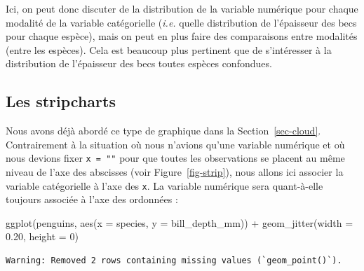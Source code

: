 \documentclass[
  a4paper,
  DIV=11,
  numbers=noendperiod,
  oneside]{scrreprt}
\newenvironment{Shaded}{}{}
\newcommand{\AttributeTok}[1]{\textcolor[rgb]{0.84,0.23,0.29}{#1}}
\newcommand{\DecValTok}[1]{\textcolor[rgb]{0.00,0.36,0.77}{#1}}
\newcommand{\FloatTok}[1]{\textcolor[rgb]{0.00,0.36,0.77}{#1}}
\newcommand{\FunctionTok}[1]{\textcolor[rgb]{0.44,0.26,0.76}{#1}}
\newcommand{\NormalTok}[1]{\textcolor[rgb]{0.14,0.16,0.18}{#1}}
\newcommand{\SpecialCharTok}[1]{\textcolor[rgb]{0.00,0.36,0.77}{#1}}
\begin{document}
Ici, on peut donc discuter de la distribution de la variable numérique
pour chaque modalité de la variable catégorielle (\emph{i.e.} quelle
distribution de l'épaisseur des becs pour chaque espèce), mais on peut
en plus faire des comparaisons entre modalités (entre les espèces). Cela
est beaucoup plus pertinent que de s'intéresser à la distribution de
l'épaisseur des becs toutes espèces confondues.

\subsection{Les stripcharts}\label{les-stripcharts}

Nous avons déjà abordé ce type de graphique dans la
Section~\ref{sec-cloud}. Contrairement à la situation où nous n'avions
qu'une variable numérique et où nous devions fixer \texttt{x\ =\ ""}
pour que toutes les observations se placent au même niveau de l'axe des
abscisses (voir Figure~\ref{fig-strip}), nous allons ici associer la
variable catégorielle à l'axe des \texttt{x}. La variable numérique sera
quant-à-elle toujours associée à l'axe des ordonnées :

\begin{Shaded}
\begin{Highlighting}[]
\FunctionTok{ggplot}\NormalTok{(penguins, }\FunctionTok{aes}\NormalTok{(}\AttributeTok{x =}\NormalTok{ species, }\AttributeTok{y =}\NormalTok{ bill\_depth\_mm)) }\SpecialCharTok{+}
  \FunctionTok{geom\_jitter}\NormalTok{(}\AttributeTok{width =} \FloatTok{0.20}\NormalTok{, }\AttributeTok{height =} \DecValTok{0}\NormalTok{)}
\end{Highlighting}
\end{Shaded}

\begin{verbatim}
Warning: Removed 2 rows containing missing values (`geom_point()`).
\end{verbatim}
\end{document}

